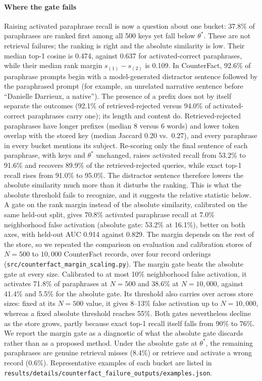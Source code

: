 \documentclass[preprint,12pt]{elsarticle}
\newif\ifmarkchanges
\newcommand{\rev}[1]{#1}
\newcommand{\revii}[1]{\ifmarkchanges{\color{blue}#1}\else#1\fi}
\begin{document}
\paragraph{Where the gate fails}
\rev{Raising activated paraphrase recall is now a question about one bucket: 37.8\% of paraphrases are ranked first among all 500 keys yet fall below $\theta^*$. These are not retrieval failures; the ranking is right and the absolute similarity is low. Their median top-1 cosine is 0.474, against 0.637 for activated-correct paraphrases, while their median rank margin $s_{(1)}-s_{(2)}$ is 0.109. In CounterFact, 92.6\% of paraphrase prompts begin with a model-generated distractor sentence followed by the paraphrased prompt (for example, an unrelated narrative sentence before ``Danielle Darrieux, a native''). The presence of a prefix does not by itself separate the outcomes (92.1\% of retrieved-rejected versus 94.0\% of activated-correct paraphrases carry one); its length and content do. Retrieved-rejected paraphrases have longer prefixes (median 8 versus 6 words) and lower token overlap with the stored key (median Jaccard 0.20 vs.\ 0.27), and every paraphrase in every bucket mentions its subject. Re-scoring only the final sentence of each paraphrase, with keys and $\theta^*$ unchanged, raises activated recall from 53.2\% to 91.6\% and recovers 89.9\% of the retrieved-rejected queries, while exact top-1 recall rises from 91.0\% to 95.0\%. The distractor sentence therefore lowers the absolute similarity much more than it disturbs the ranking. This is what the absolute threshold fails to recognize, and it suggests the relative statistic below. A gate on the rank margin instead of the absolute similarity, calibrated on the same held-out split, gives 70.8\% activated paraphrase recall at 7.0\% neighborhood false activation (absolute gate: 53.2\% at 16.1\%), better on both axes, with held-out AUC 0.914 against 0.829. \revii{The margin depends on the rest of the store, so we repeated the comparison on evaluation and calibration stores of $N=500$ to $10{,}000$ CounterFact records, over four record orderings (\nolinkurl{src/counterfact_margin_scaling.py}). The margin gate beats the absolute gate at every size. Calibrated to at most 10\% neighborhood false activation, it activates 71.8\% of paraphrases at $N=500$ and 38.6\% at $N=10{,}000$, against 41.4\% and 5.5\% for the absolute gate. Its threshold also carries over across store sizes: fixed at its $N=500$ value, it gives 8--13\% false activation up to $N=10{,}000$, whereas a fixed absolute threshold reaches 55\%. Both gates nevertheless decline as the store grows, partly because exact top-1 recall itself falls from 90\% to 76\%.} We report the margin gate as a diagnostic of what the absolute gate discards rather than as a proposed method. Under the absolute gate at $\theta^*$, the remaining paraphrases are genuine retrieval misses (8.4\%) or retrieve and activate a wrong record (0.6\%). Representative examples of each bucket are listed in \nolinkurl{results/details/counterfact_failure_outputs/examples.json}.}
\end{document}
